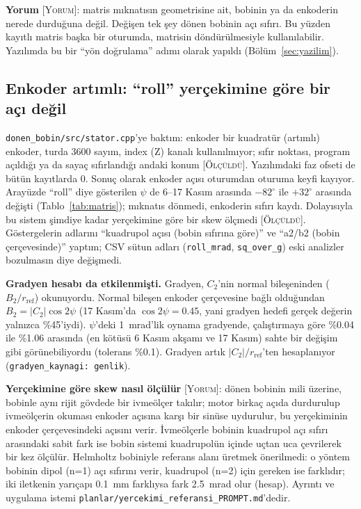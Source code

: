 \documentclass[11pt,a4paper]{article}
\newcommand{\kod}[1]{\texttt{#1}}
\newcommand{\olc}{\textsc{[Ölçüldü]}}
\newcommand{\yor}{\textsc{[Yorum]}}
\begin{document}
\textbf{Yorum} \yor: matris mıknatısın geometrisine ait, bobinin ya da enkoderin nerede durduğuna değil. Değişen
tek şey dönen bobinin açı sıfırı. Bu yüzden kayıtlı matris başka bir oturumda, matrisin döndürülmesiyle
kullanılabilir. Yazılımda bu bir ``yön doğrulama'' adımı olarak yapıldı (Bölüm~\ref{sec:yazilim}).

\subsection{Enkoder artımlı: ``roll'' yerçekimine göre bir açı değil}
\label{sec:enkoder}

\kod{donen\_bobin/src/stator.cpp}'ye baktım: enkoder bir kuadratür (artımlı) enkoder, turda 3600 sayım, index
(Z) kanalı kullanılmıyor; sıfır noktası, program açıldığı ya da sayaç sıfırlandığı andaki konum \olc. Yazılımdaki
faz ofseti de bütün kayıtlarda 0. Sonuç olarak enkoder açısı oturumdan oturuma keyfi kayıyor. Arayüzde ``roll'' diye
gösterilen $\psi$ de 6--17 Kasım arasında $-82^\circ$ ile $+32^\circ$ arasında değişti (Tablo~\ref{tab:matris});
mıknatıs dönmedi, enkoderin sıfırı kaydı. Dolayısıyla bu sistem şimdiye kadar yerçekimine göre bir skew
ölçmedi \olc. Göstergelerin adlarını ``kuadrupol açısı (bobin sıfırına göre)'' ve ``a2/b2 (bobin çerçevesinde)''
yaptım; CSV sütun adları (\kod{roll\_mrad}, \kod{sq\_over\_g}) eski analizler bozulmasın diye değişmedi.

\textbf{Gradyen hesabı da etkilenmişti.} Gradyen, $C_2$'nin normal bileşeninden ($B_2/r_\text{ref}$) okunuyordu.
Normal bileşen enkoder çerçevesine bağlı olduğundan $B_2 = |C_2|\cos 2\psi$ (17 Kasım'da $\cos 2\psi = 0.45$, yani
gradyen hedefi gerçek değerin yalnızca \%45'iydi). $\psi$'deki 1~mrad'lik oynama gradyende, çalıştırmaya göre \%0.04 ile \%1.06 arasında (en kötüsü 6 Kasım akşamı ve
17 Kasım) sahte bir değişim gibi görünebiliyordu (tolerans \%0.1). Gradyen artık $|C_2|/r_\text{ref}$'ten hesaplanıyor
(\kod{gradyen\_kaynagi: genlik}).

\textbf{Yerçekimine göre skew nasıl ölçülür} \yor: dönen bobinin mili üzerine, bobinle aynı rijit gövdede bir
ivmeölçer takılır; motor birkaç açıda durdurulup ivmeölçerin okuması enkoder açısına karşı bir sinüse uydurulur, bu
yerçekiminin enkoder çerçevesindeki açısını verir. İvmeölçerle bobinin kuadrupol açı sıfırı arasındaki sabit
fark ise bobin sistemi kuadrupolün içinde uçtan uca çevrilerek bir kez ölçülür. Helmholtz bobiniyle referans alanı
üretmek önerilmedi: o yöntem bobinin dipol (n=1) açı sıfırını verir, kuadrupol (n=2) için gereken ise farklıdır;
iki iletkenin yarıçapı 0.1~mm farklıysa fark 2.5~mrad olur (hesap). Ayrıntı ve uygulama istemi
\kod{planlar/yercekimi\_referansi\_PROMPT.md}'dedir.
\end{document}
